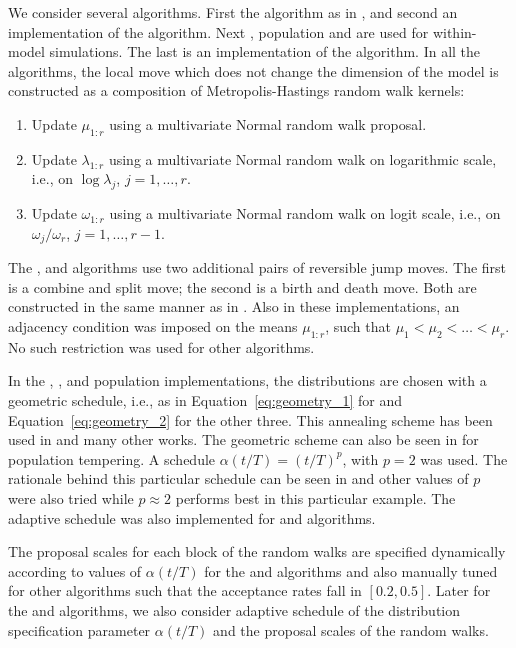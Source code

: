 We consider several algorithms. First the \rjmcmc algorithm as in
\cite{Richardson:1997ea}, and second an implementation of the \smc[1]
algorithm. Next \ais, population \mcmc and \smc[2] are used for within-model
simulations. The last is an implementation of the \smc[3] algorithm. In all
the algorithms, the local move which does not change the dimension of the
model is constructed as a composition of Metropolis-Hastings random walk
kernels:
\begin{enumerate}
  \item Update $\mu_{1:r}$ using a multivariate Normal random walk proposal.
  \item Update $\lambda_{1:r}$ using a multivariate Normal random walk on
    logarithmic scale, i.e., on $\log\lambda_{j}$, $j = 1, \dots, r$.
  \item Update $\omega_{1:r}$ using a multivariate Normal random walk on logit
    scale, i.e., on $\omega_{j}/\omega_r$, $j = 1,\dots,r-1$.
\end{enumerate}
The \rjmcmc, \smc[1] and \smc[3] algorithms use two additional pairs of
reversible jump moves. The first is a combine and split move; the second is a
birth and death move. Both are constructed in the same manner as in
\cite{Richardson:1997ea}. Also in these implementations, an adjacency
condition was imposed on the means $\mu_{1:r}$, such that $\mu_1 < \mu_2 <
\dots < \mu_r$. No such restriction was used for other algorithms.

In the \smc[1], \smc[2], \ais and population \mcmc implementations, the
distributions are chosen with a geometric schedule, i.e., as in
Equation~\eqref{eq:geometry_1} for \smc[1] and Equation~\eqref{eq:geometry_2}
for the other three. This annealing scheme has been used in
\cite{DelMoral:2006hc,Jasra:2007in} and many other works. The geometric scheme
can also be seen in \cite{Calderhead:2009bd} for population \mcmc tempering. A
schedule $\alpha(t/T) = (t/T)^p$, with $p = 2$ was used. The rationale behind
this particular schedule can be seen in \cite{Calderhead:2009bd} and other
values of $p$ were also tried while $p\approx2$ performs best in this
particular example. The adaptive schedule was also implemented for \smc[2] and
\ais algorithms.

The proposal scales for each block of the random walks are specified
dynamically according to values of $\alpha(t/T)$ for the \smc[2] and \ais
algorithms and also manually tuned for other algorithms such that the
acceptance rates fall in $[0.2, 0.5]$. Later for the \smc[2] and \ais
algorithms, we also consider adaptive schedule of the distribution
specification parameter $\alpha(t/T)$ and the proposal scales of the random
walks.


